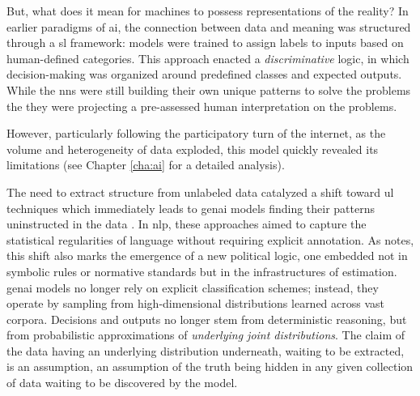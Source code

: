 But, what does it mean for machines to possess representations of the reality? In earlier paradigms of \gls{ai}, the connection between data and meaning was structured through a \gls{sl} framework: models were trained to assign labels to inputs based on human-defined categories. This approach enacted a \textit{discriminative} logic, in which decision-making was organized around predefined classes and expected outputs. While the \glspl{nn} were still building their own unique patterns to solve the problems the they were projecting a pre-assessed human interpretation on the problems.

However, particularly following the participatory turn of the internet, as the volume and heterogeneity of data exploded, this model quickly revealed its limitations (see Chapter \ref{cha:ai} for a detailed analysis).

The need to extract structure from unlabeled data catalyzed a shift toward \gls{ul} techniques which immediately leads to \gls{genai} models finding their patterns uninstructed in the data . In \gls{nlp}, these approaches aimed to capture the statistical regularities of language without requiring explicit annotation. As \textcite[3]{amoore2024} notes, this shift also marks the emergence of a new political logic, one embedded not in symbolic rules or normative standards but in the infrastructures of estimation. \gls{genai} models no longer rely on explicit classification schemes; instead, they operate by sampling from high-dimensional distributions learned across vast corpora. Decisions and outputs no longer stem from deterministic reasoning, but from probabilistic approximations of \textit{underlying joint distributions}. The  claim of the data having an underlying distribution underneath, waiting to be extracted, is an assumption, an assumption of the truth being hidden in any given collection of data waiting to be discovered by the model.


